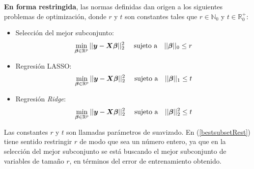 \documentclass[a4paper,12pt]{report}
\begin{document}
\textbf{En forma restringida}, las normas definidas dan origen a los siguientes problemas de optimización, donde $r$ y $t$ son constantes tales que $r \in \mathbb{N}_0$ y $t \in \mathbb{R}_0^+$:
\begin{itemize}
\item Selección del mejor subconjunto:
\begin{equation}
\label{bestsubsetRest}
\operatornamewithlimits{min}\limits_{\boldsymbol{\beta} \in \mathbb{R}^p} ||\boldsymbol{y}-\boldsymbol{X}\boldsymbol{\beta} ||_2^2 \text{ } \text{ } \text{ } \text{ sujeto a } \text{ } \text{ } ||\boldsymbol{\beta}||_0 \leq r
\end{equation}
\item Regresión LASSO:
\begin{equation}
\label{lassoRest}
\operatornamewithlimits{min}\limits_{\boldsymbol{\beta} \in \mathbb{R}^p} ||\boldsymbol{y}-\boldsymbol{X}\boldsymbol{\beta} ||_2^2 \text{ } \text{ } \text{ } \text{ sujeto a } \text{ } \text{ } ||\boldsymbol{\beta}||_1 \leq t
\end{equation}
\item Regresión \textit{Ridge}:
\begin{equation}
\label{ridgeRest}
\operatornamewithlimits{min}\limits_{\boldsymbol{\beta} \in \mathbb{R}^p} ||\boldsymbol{y}-\boldsymbol{X}\boldsymbol{\beta} ||_2^2 \text{ } \text{ } \text{ } \text{ sujeto a } \text{ } \text{ } ||\boldsymbol{\beta}||_2^2 \leq t
\end{equation}
\end{itemize}

Las constantes $r$ y $t$ son llamadas parámetros de suavizado. En (\ref{bestsubsetRest}) tiene sentido restringir $r$ de modo que sea un número entero, ya que en la selección del mejor subconjunto se está buscando el mejor subconjunto de variables de tamaño $r$, en términos del error de entrenamiento obtenido.
\end{document}
